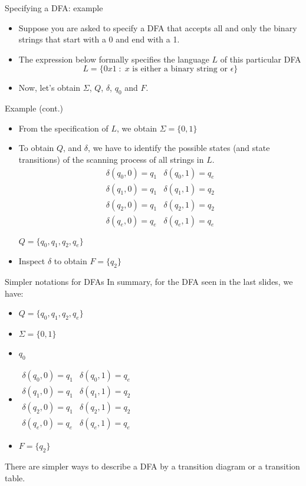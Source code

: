 \documentclass{prosper}%
\begin{document}
\begin{slide}{Specifying a DFA: example}
\begin{itemize}
\item Suppose you are asked to specify a DFA that accepts all and only the binary strings that start with a 0 and end with a 1.
\item The expression below formally specifies the language $L$ of this particular DFA 
\[
L=\{0x1\;:\; \mbox{$x$ is either a binary string or $\epsilon$}\}
\]
\item Now, let's obtain $\Sigma$, $Q$, $\delta$, $q_0$ and $F$. 
\end{itemize}
\end{slide}

\begin{slide}{Example (cont.)}
\begin{itemize}
\item From the specification of $L$, we obtain $\Sigma=\{0,1\}$
\item To obtain $Q$, and $\delta$, we have to identify the possible states  (and state transitions)
of the scanning process of all strings in $L$.
\[
\begin{array}{l|l}
\delta(q_0,0)=q_1&
\delta(q_0, 1)=q_e\\
\delta(q_1, 0)=q_1&
\delta(q_1,1) = q_2\\
\delta(q_2,0) = q_1&
\delta(q_2,1)=q_2\\
\delta(q_e, 0)=q_e &
\delta(q_e, 1)=q_e
\end{array}
\]

 $Q=\{q_0, q_1, q_2, q_e\}$
\item Inspect $\delta$ to obtain 
\(F=\{q_2\}
\)
\end{itemize}
\end{slide}

\begin{slide}{Simpler notations for DFAs}
In summary, for the DFA seen in the last slides, we have:
\begin{itemize}
\item $Q=\{q_0,q_1, q_2, q_e\}$
\item $\Sigma=\{0,1\}$
\item $q_0$
\item 
\(
\begin{array}{l|l}
\delta(q_0,0)=q_1&
\delta(q_0, 1)=q_e\\
\delta(q_1, 0)=q_1&
\delta(q_1,1) = q_2\\
\delta(q_2,0) = q_1&
\delta(q_2,1)=q_2\\
\delta(q_e, 0)=q_e &
\delta(q_e, 1)=q_e
\end{array}
\)
\item $F=\{q_2\}$
\end{itemize}
There are simpler ways to describe a DFA by a {\blue transition diagram} or a {\blue transition table}.
\end{slide}
\end{document}
